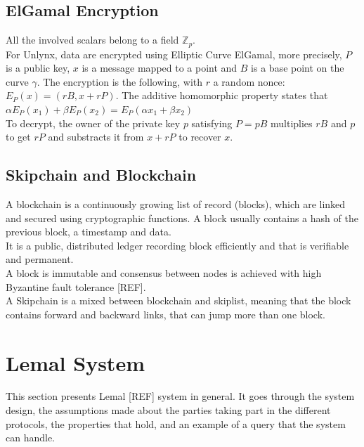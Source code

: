 \documentclass{article}
\begin{document}
\subsection{ElGamal Encryption}
All the involved scalars belong to a field $\mathbb{Z}_p$.\\
For Unlynx, data are encrypted using Elliptic Curve ElGamal, more precisely, $P$ is a public key, $x$ is a message mapped to a point and $B$ is a base point on the curve $\gamma$. The encryption is the following, with $r$ a random nonce:\\
$E_P(x) = (rB,x+rP)$. The additive homomorphic property states that $\alpha E_P(x_1) + \beta E_P(x_2) = E_P(\alpha x_1+ \beta x_2)$\\
To decrypt, the owner of the private key $p$ satisfying $P = pB$ multiplies $rB$ and $p$ to get $rP$ and substracts it from $x + rP$ to recover $x$.\\

\subsection{Skipchain and Blockchain}
A blockchain is a continuously growing list of record (blocks), which are linked and secured using cryptographic functions. A block usually contains a hash of the previous block, a timestamp and data.\\
It is a public, distributed ledger recording block efficiently and that is verifiable and permanent.\\
A block is immutable and consensus between nodes is achieved with high Byzantine fault tolerance [REF].\\
A Skipchain is a mixed between blockchain and skiplist, meaning that the block contains forward and backward links, that can jump more than one block.\\


\section{Lemal System}
This section presents Lemal [REF] system in general. It goes through the system design, the assumptions made about the parties taking part in the different protocols, the properties that hold, and an example of a query that the system can handle.\\
\end{document}
